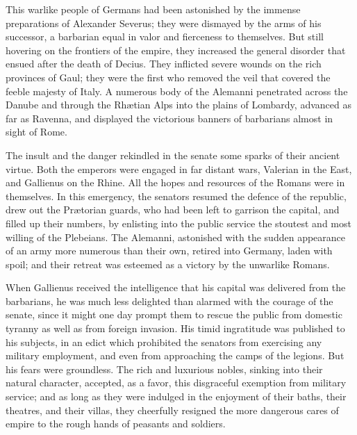 

This warlike people of Germans had been astonished by the immense
preparations of Alexander Severus; they were dismayed by the arms
of his successor, a barbarian equal in valor and fierceness to
themselves. But still hovering on the frontiers of the empire,
they increased the general disorder that ensued after the death
of Decius. They inflicted severe wounds on the rich provinces of
Gaul; they were the first who removed the veil that covered the
feeble majesty of Italy. A numerous body of the Alemanni
penetrated across the Danube and through the Rhætian Alps into
the plains of Lombardy, advanced as far as Ravenna, and displayed
the victorious banners of barbarians almost in sight of Rome.\footnotemark[88]


The insult and the danger rekindled in the senate some sparks of
their ancient virtue. Both the emperors were engaged in far
distant wars, Valerian in the East, and Gallienus on the Rhine.
All the hopes and resources of the Romans were in themselves. In
this emergency, the senators resumed the defence of the republic,
drew out the Prætorian guards, who had been left to garrison the
capital, and filled up their numbers, by enlisting into the
public service the stoutest and most willing of the Plebeians.
The Alemanni, astonished with the sudden appearance of an army
more numerous than their own, retired into Germany, laden with
spoil; and their retreat was esteemed as a victory by the
unwarlike Romans.\footnotemark[89]


When Gallienus received the intelligence that his capital was
delivered from the barbarians, he was much less delighted than
alarmed with the courage of the senate, since it might one day
prompt them to rescue the public from domestic tyranny as well as
from foreign invasion. His timid ingratitude was published to his
subjects, in an edict which prohibited the senators from
exercising any military employment, and even from approaching the
camps of the legions. But his fears were groundless. The rich and
luxurious nobles, sinking into their natural character, accepted,
as a favor, this disgraceful exemption from military service; and
as long as they were indulged in the enjoyment of their baths,
their theatres, and their villas, they cheerfully resigned the
more dangerous cares of empire to the rough hands of peasants and
soldiers.\footnotemark[90]

